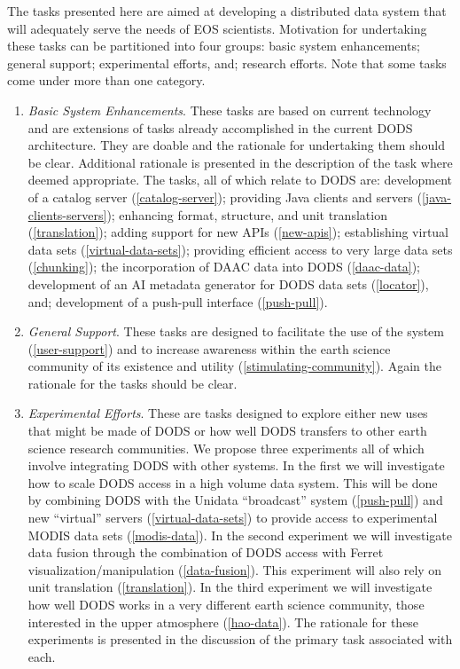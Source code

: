\documentclass[12pt]{article}
\begin{document}
The tasks presented here are aimed at developing a distributed 
data system that will adequately serve the needs of \acs{EOS} 
scientists. Motivation for undertaking these tasks can be partitioned
into four groups: basic system enhancements; general support;
experimental efforts, and; research efforts. Note that some tasks 
come under more than one category.

\begin{enumerate}
\item \emph{Basic System Enhancements}. These tasks are based on
current technology and are extensions of tasks already accomplished
in the current \ac{DODS} architecture. They are doable and the 
rationale for undertaking them should be clear. Additional rationale
is presented in the description of the task where deemed appropriate. 
The tasks, all of which relate to \ac{DODS} are: development of a 
catalog server (\ref{catalog-server}); providing Java clients 
and servers (\ref{java-clients-servers}); enhancing format, 
structure, and unit translation (\ref{translation}); adding support 
for new \acs{API}s (\ref{new-apis}); establishing virtual data sets 
(\ref{virtual-data-sets}); providing efficient access to very large 
data sets (\ref{chunking}); the incorporation of \ac{DAAC} data into 
\ac{DODS} (\ref{daac-data}); development of an \ac{AI} metadata 
generator for \ac{DODS} data sets (\ref{locator}), and; development of
a push-pull interface (\ref{push-pull}).

\item \emph{General Support}. These tasks are designed to facilitate
the use of the system (\ref{user-support}) and to increase awareness 
within the earth science community of its existence and utility
(\ref{stimulating-community}). Again the rationale for the tasks 
should be clear. 

\item \emph{Experimental Efforts}. These are tasks designed to
explore either new uses that might be made of \ac{DODS} or how 
well \ac{DODS} transfers to other earth science research
communities. We propose three experiments all of which involve
integrating \ac{DODS} with other systems. In the first we will
investigate how to scale \ac{DODS} access in a high volume data
system. This will be done by combining \ac{DODS} with the Unidata
``broadcast'' system (\ref{push-pull}) and new ``virtual'' servers
(\ref{virtual-data-sets}) to provide access to experimental \acs{MODIS}
data sets (\ref{modis-data}). In the second experiment we will 
investigate data fusion through the combination of \ac{DODS} access 
with Ferret visualization/manipulation (\ref{data-fusion}). This
experiment will also rely on unit translation (\ref{translation}).
In the third experiment we will investigate how well \ac{DODS}
works in a very different earth science community, those interested
in the upper atmosphere (\ref{hao-data}). The rationale for these
experiments is presented in the discussion of the primary task 
associated with each.


\end{enumerate}
\end{document}
